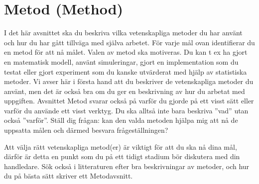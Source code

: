 \section{Metod (Method)} 
\label{sec:method}

I det h\"{a}r avsnittet ska du beskriva vilka vetenskapliga metoder du har anv\"{a}nt och hur du har g\r{a}tt tillv\"{a}ga med sj\"{a}lva arbetet. F\"{o}r varje m\r{a}l ovan identifierar du en metod f\"{o}r att n\r{a} m\r{a}let. Valen av metod ska motiveras. Du kan t ex ha gjort en matematisk modell, anv\"{a}nt simuleringar, gjort en implementation som du testat eller gjort experiment som du kanske utv\"{a}rderat med hj\"{a}lp av statistiska metoder. Vi avser h\"{a}r i f\"{o}rsta hand att du beskriver de vetenskapliga metoder du anv\"{a}nt, men det \"{a}r ocks\r{a} bra om du ger en beskrivning av hur du arbetat med uppgiften. Avsnittet Metod svarar ocks\r{a} p\r{a} varf\"{o}r du gjorde p\r{a} ett visst s\"{a}tt eller varf\"{o}r du anv\"{a}nde ett visst verktyg. Du ska allts\r{a} inte bara beskriva ”vad” utan  ocks\r{a} ”varf\"{o}r”. St\"{a}ll dig fr\r{a}gan: kan den valda metoden hj\"{a}lpa mig att n\r{a} de uppsatta m\r{a}len och d\"{a}rmed besvara fr\r{a}gest\"{a}llningen?

Att v\"{a}lja r\"{a}tt vetenskapliga metod(er) \"{a}r viktigt f\"{o}r att du ska n\r{a} dina m\r{a}l, d\"{a}rf\"{o}r \"{a}r detta en punkt som du p\r{a} ett tidigt stadium b\"{o}r diskutera med din handledare. S\"{o}k ocks\r{a} i litteraturen efter bra beskrivningar av metoder, och hur du p\r{a} b\"{a}sta s\"{a}tt skriver ett Metodavsnitt. 
